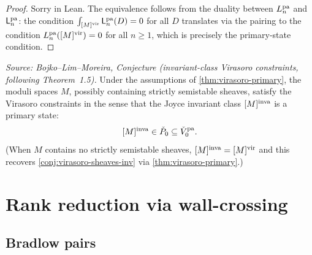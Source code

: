 \begin{proof}
  Sorry in Lean. The equivalence follows from the duality between \(L_n^{\mathrm{pa}}\) and
  \(\mathsf{L}_n^{\mathrm{pa}}\): the condition \(\int_{[M]^{\mathrm{vir}}} \mathsf{L}_n^{\mathrm{pa}}(D) = 0\) for all \(D\)
  translates via the pairing to the condition \(L_n^{\mathrm{pa}}([M]^{\mathrm{vir}}) = 0\) for all
  \(n \geq 1\), which is precisely the primary-state condition.
\end{proof}


\begin{conjecture}[VirasoroConjectureInvariantClasses]
  \label{conj:actualinvvir}
  \textit{Source: Bojko--Lim--Moreira, Conjecture (invariant-class Virasoro
  constraints, following Theorem~1.5).}
  Under the assumptions of \cref{thm:virasoro-primary}, the moduli spaces \(M\),
  possibly containing strictly semistable sheaves, satisfy the Virasoro constraints
  in the sense that the Joyce invariant class \([M]^{\mathrm{inva}}\) is a primary state:
  \[[M]^{\mathrm{inva}} \in \check{P}_0 \subseteq \check{V}_0^{\mathrm{pa}}.\]
  (When \(M\) contains no strictly semistable sheaves, \([M]^{\mathrm{inva}} = [M]^{\mathrm{vir}}\) and
  this recovers \cref{conj:virasoro-sheaves-inv} via \cref{thm:virasoro-primary}.)
\end{conjecture}

\section{Rank reduction via wall-crossing}
\label{sec:main-results}

\subsection{Bradlow pairs}


